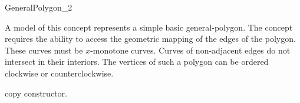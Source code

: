 \ccRefPageBegin

\begin{ccRefConcept}{GeneralPolygon_2}


\ccDefinition
A model of this concept represents a simple basic general-polygon. The
concept requires the ability to access the geometric mapping of the
edges of the polygon. These curves must be $x$-monotone curves. Curves
of non-adjacent edges do not intersect in their interiors. The
vertices of such a polygon can be ordered clockwise or counterclockwise. 

\ccCreation
{}

\ccThreeToTwo

\ccGlue
{}
{copy constructor.}
\ccGlue
{}

% 
% 
% 

\ccPredicates

\ccHasModels

\end{ccRefConcept}

\ccRefPageEnd
